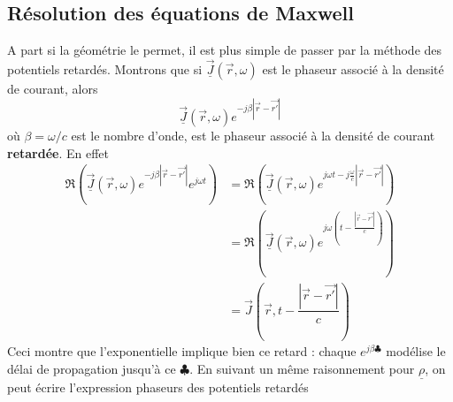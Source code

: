 	\subsection{Résolution des équations de Maxwell}
	A part si la géométrie le permet, il est plus simple de passer par la méthode des potentiels 
	retardés. Montrons que si $\underline{\vec{J}}(\vec{r},\omega)$ est le phaseur associé à la 
	densité de courant, alors
	\begin{equation}
	\underline{\vec{J}}(\vec r,\omega)e^{-j\beta|\vec{r}-\vec{r'}|}
	\end{equation}
	où $\beta = \omega/c$ est le nombre d'onde, est le phaseur associé à la densité de courant 
	\textbf{retardée}. En effet
	\begin{equation}
	\begin{split}
	\Re\left(\underline{\vec{J}}(\vec{r},\omega)e^{-j\beta|\vec{r}-\vec{r'}|}e^{j\omega t}\right) &=
	\Re\left(\underline{\vec{J}}(\vec{r},\omega)e^{j\omega t - j\frac{\omega}{c} |\vec{r}-\vec{r'}|}
	\right)	 \\
	&=\Re \left(\underline{\vec{J}}(\vec{r},\omega)e^{j\omega\left(t-\frac{|\vec{r}-\vec{r'}|}{c}\right)}
	\right)\\
	&= \vec{J}\left(\vec{r},t-\dfrac{|\vec{r}-\vec{r'}|}{c}\right)
	\end{split}
	\end{equation}
	Ceci montre que l'exponentielle implique bien ce retard : chaque $e^{j\beta\clubsuit}$ modélise 
	le délai de propagation jusqu'à ce $\clubsuit$. En suivant un même raisonnement pour $\underline{
	\rho}$,  on peut écrire l'expression phaseurs des potentiels retardés\\
	

